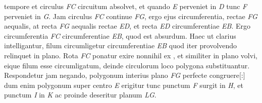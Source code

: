 \noindent {} 
\pend
\pstart
\noindent tempore et circulus \textit{FC} circuitum absolvet, et quando \textit{E} perveniet in \textit{D} tunc \textit{F} perveniet in \textit{G}. Jam circulus \textit{FC} continue  \textit{FG}, ergo ejus circumferentia, rectae \textit{FG} aequalis, at recta \textit{FG} aequalis rectae \textit{ED}, et recta \textit{ED} circumferentiae \textit{EB}. Ergo circumferentia \textit{FC} circumferentiae \textit{EB}, quod est absurdum. Haec ut clarius intelligantur, filum circumligetur circumferentiae \textit{EB} quod iter provolvendo relinquet in plano. Rota \textit{FC} ponatur exire nonnihil ex , et similiter in plano  volvi, eique filum esse circumligatum, deinde circulorum loco polygona substituantur. Respondetur jam negando, polygonum interius plano \textit{FG} perfecte congruere[:] dum enim polygonum super centro \textit{E} erigitur tunc punctum \textit{F} surgit in \textit{H}, et punctum \textit{I} in \textit{K} ac proinde deseritur planum \textit{LG}.%